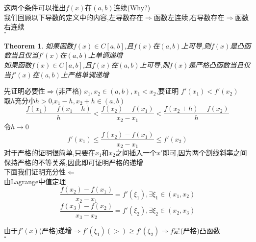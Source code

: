 \documentclass[11pt,hyperref,a4paper,UTF8]{ctexart}
\newtheorem{theorem}{Theorem}[subsection]
\newenvironment{cproof}{%
\heiti{证明}\kaishu
}{%
  \hfill $\square$
  \par\bigskip
}
\begin{document}
\begin{CJK}{UTF8}{gkai}
\begin{cproof}
\begin{center}
  \end{center}
这两个条件可以推出$f(x)$在$(a,b)$连续(Why?)\\
我们回顾以下导数的定义中的内容,左导数存在$\Rightarrow$函数左连续,右导数存在$\Rightarrow$函数右连续\\
\end{cproof}
\begin{theorem}
如果函数$f(x)\in C[a,b]$,且$f(x)$在$(a,b)$上可导,则$f(x)$是凸函数当且仅当$f'(x)$在$(a,b)$上单调递增\\

如果函数$f(x)\in C[a,b]$,且$f(x)$在$(a,b)$上可导,则$f(x)$是严格凸函数当且仅当$f'(x)$在$(a,b)$上严格单调递增\\
\end{theorem}
\begin{cproof}
先证明必要性$\Rightarrow$(非严格)
$x_1,x_2 \in(a,b),x_1 < x_2 $,要证明 $f'(x_1) < f'(x_2)$\\
取$h$充分小$h>0$,$x_1-h , x_2 + h \in (a,b)$\\
\[\dfrac{f(x_1) - f(x_1 - h)}{h} < \dfrac{f(x_2) - f(x_1)}{x_2 - x_1} < \dfrac{f(x_2 + h) - f(x_2)}{h}\]
令$h\to 0$\\
\[f'(x_1) \leq \dfrac{f(x_2) - f(x_1)}{x_2 - x_1} \leq f'(x_2)\]
对于严格的证明很简单,只要在$x_1和x_2$之间插入一个$x'$即可,因为两个割线斜率之间保持严格的不等关系,因此即可证明严格的递增\\

下面我们证明充分性$\Leftarrow$\\

由Lagrange中值定理
\[\dfrac{f(x_2) - f(x_1)}{x_2 - x_1} = f'(\xi_1) ,\exists\xi_1 \in (x_1,x_2)\]
\[\dfrac{f(x_3) - f(x_2)}{x_3 - x_2} = f'(\xi_2) ,\exists\xi_2 \in (x_2,x_3)\]

由于$f'(x)$(严格)递增$\Rightarrow f'(\xi_1) (>) \geq f'(\xi_2)\Rightarrow f$是(严格)凸函数\\


\end{cproof}
\end{CJK}
\end{document}
